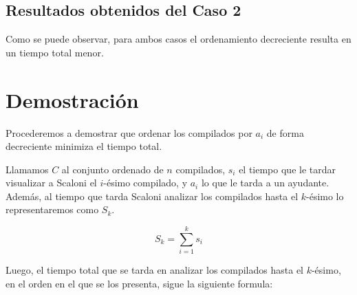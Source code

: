 


\subsection{Resultados obtenidos del Caso 2}



Como se puede observar, para ambos casos el ordenamiento decreciente resulta en un tiempo total menor.

\section{Demostración}

Procederemos a demostrar que ordenar los compilados por $a_i$ de forma decreciente minimiza el tiempo total.

Llamamos $C$ al conjunto ordenado de $n$ compilados, $s_i$ el tiempo que le tardar visualizar a Scaloni el $i$-ésimo compilado, y
$a_i$ lo que le tarda a un ayudante. Además, al tiempo que tarda Scaloni analizar los compilados hasta el $k$-ésimo lo representaremos como $S_k$.

$$
S_{k}=\sum_{i=1}^{k}s_{i} 
$$

Luego, el tiempo total que se tarda en analizar los compilados hasta el $k$-ésimo, en el orden
en el que se los presenta, sigue la siguiente formula:


